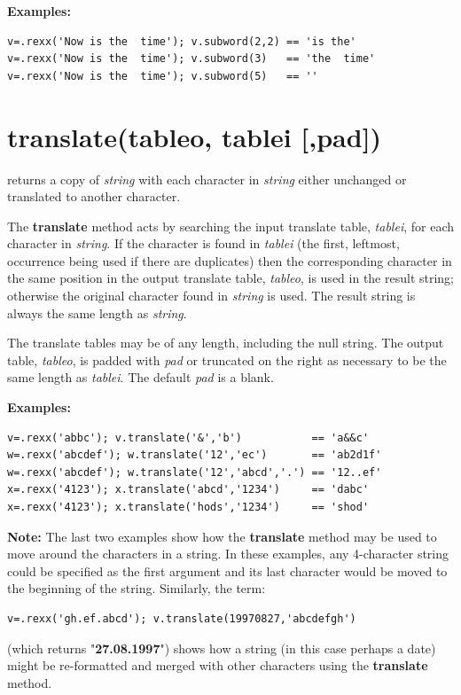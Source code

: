 \textbf{Examples:}
\begin{lstlisting}
v=.rexx('Now is the  time'); v.subword(2,2) == 'is the'
v=.rexx('Now is the  time'); v.subword(3)   == 'the  time'
v=.rexx('Now is the  time'); v.subword(5)   == ''
\end{lstlisting}

\index{,}
\section{translate(tableo, tablei [,pad{]})}\label{reftrans}
returns a copy of \emph{string} with each character in
\emph{string} either unchanged or translated to another character.
 
The \textbf{translate} method acts by searching the input translate
table, \emph{tablei}, for each character in \emph{string}.
If the character is found in \emph{tablei} (the first, leftmost,
occurrence being used if there are duplicates) then the corresponding
character in the same position in the output translate table,
\emph{tableo}, is used in the result string; otherwise the original
character found in \emph{string} is used.
The result string is always the same length as \emph{string}.
 
The translate tables may be of any length, including the null string.
The output table, \emph{tableo}, is padded with \emph{pad} or
truncated on the right as necessary to be the same length as
\emph{tablei}.
The default \emph{pad} is a blank.
 
\textbf{Examples:}
\begin{lstlisting}
v=.rexx('abbc'); v.translate('&','b')           == 'a&&c'
w=.rexx('abcdef'); w.translate('12','ec')       == 'ab2d1f'
w=.rexx('abcdef'); w.translate('12','abcd','.') == '12..ef'
x=.rexx('4123'); x.translate('abcd','1234')     == 'dabc'
x=.rexx('4123'); x.translate('hods','1234')     == 'shod'
\end{lstlisting}
\textbf{Note: }The last two examples show how the \textbf{translate} method
may be used to move around the characters in a string.
In these examples, any 4-character string could be specified as the
first argument and its last character would be moved to the beginning of
the string.
Similarly, the term:
\begin{lstlisting}
v=.rexx('gh.ef.abcd'); v.translate(19970827,'abcdefgh')
\end{lstlisting}
(which returns "\textbf{27.08.1997}") shows how a string (in
this case perhaps a date) might be re-formatted and merged with other
characters using the \textbf{translate} method.

